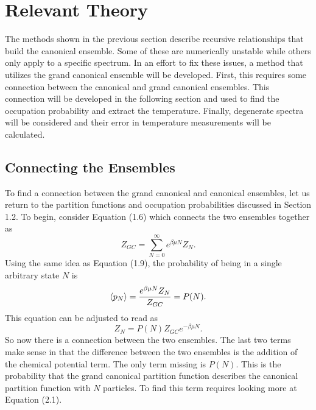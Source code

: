 \chapter{Relevant Theory} \label{ch:ns-equations}
\begin{em}
The methods shown in the previous section describe recursive relationships that build the canonical ensemble. Some of these are numerically unstable while others only apply to a specific spectrum. In an effort to fix these issues, a method that utilizes the grand canonical ensemble will be developed. First, this requires some connection between the canonical and grand canonical ensembles. This connection will be developed in the following section and used to find the occupation probability and extract the temperature. Finally, degenerate spectra will be considered and their error in temperature measurements will be calculated.  
\end{em}
\section{Connecting the Ensembles}
To find a connection between the grand canonical and canonical ensembles, let us return to the partition functions and occupation probabilities discussed in Section 1.2. To begin, consider Equation (1.6) which connects the two ensembles together as 
\begin{equation*}
    Z_{GC}=\sum_{N=0}^{\infty} e^{\beta\mu N} Z_{N}.
\end{equation*}
Using the same idea as Equation (1.9), the probability of being in a single arbitrary state $N$ is 
\begin{equation}
    \left<{p_N}\right>=\frac{e^{\beta\mu N} Z_N}{Z_{GC}}=P(N).
\end{equation}
This equation can be adjusted to read as
\begin{equation}
    Z_N=P(N) Z_{GC} e^{-\beta\mu N}.
\end{equation}
So now there is a connection between the two ensembles. The last two terms make sense in that the difference between the two ensembles is the addition of the chemical potential term. The only term missing is $P(N)$. This is the probability that the grand canonical partition function describes the canonical partition function with $N$ particles. To find this term requires looking more at Equation (2.1).

